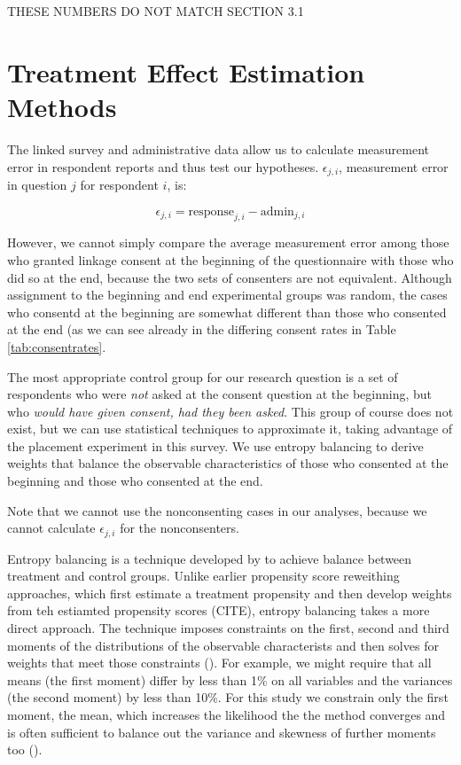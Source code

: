 THESE NUMBERS DO NOT MATCH SECTION 3.1


\section{Treatment Effect Estimation Methods}\label{method}

The linked survey and administrative data allow us to calculate measurement error in respondent reports and thus test our hypotheses. $\epsilon_{j,i}$,  measurement error in question $j$ for respondent $i$, is:

\begin{equation}
\epsilon_{j,i} = \text{response}_{j,i} - \text{admin}_{j,i}
\label{eq:hyp_epsi}
\end{equation}

However, we cannot simply compare the average measurement error among those who granted linkage consent at the beginning of the questionnaire with those who did so at the end, because the two sets of consenters are not equivalent.  Although assignment to the beginning and end experimental groups was random, the cases who consentd at the beginning are somewhat different than those who consented at the end (as we can see already in the differing consent rates in Table \ref{tab:consentrates}. 

The most appropriate control group for our research question is a set of respondents who were \textit{not} asked at the consent question at the beginning, but who \textit{would have given consent, had they been asked}. This group of course does not exist, but we can use statistical techniques to approximate it, taking advantage of the placement experiment in this survey. We use entropy balancing to derive weights that balance the observable characteristics of those who consented at the beginning and those who consented at the end. 

Note that we cannot use the nonconsenting cases in our analyses, because we cannot calculate $\epsilon_{j,i}$ for the nonconsenters.

Entropy balancing is a technique developed by \cite{Hainmueller12} to achieve balance between treatment and control groups. Unlike earlier propensity score reweithing approaches, which first estimate a treatment propensity and then develop weights from teh estiamted propensity scores (CITE), entropy balancing takes a more direct approach. The technique imposes constraints on the first, second and third moments of the distributions of the observable characterists and then solves for weights that meet those constraints (\cite{Hainmueller12}). For example, we might require that all means (the first moment) differ by less than 1\% on all variables and the variances (the second moment) by less than 10\%. For this study we constrain only the first moment, the mean, which increases the likelihood the the method converges and is often sufficient to balance out the variance and skewness of further moments too (\cite{Hainmuelleretal13}).

